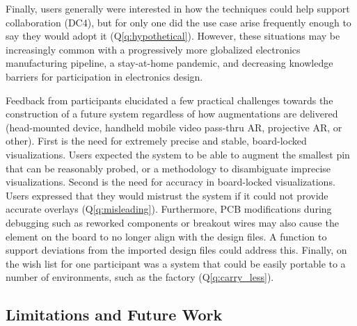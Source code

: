 \documentclass [11pt, proquest] {uwthesis}[2020/02/24]
\newcounter{sharc}
\newcommand{\sharcref}[1]{Q\ref{#1}} %
\begin{document}
Finally, users generally were interested in how the techniques could help support collaboration (DC4), but for only one did the use case arise frequently enough to say they would adopt it (\sharcref{q:hypothetical}). However, these situations may be increasingly common with a progressively more globalized electronics manufacturing pipeline, a stay-at-home pandemic, and decreasing knowledge barriers for participation in electronics design.

Feedback from participants elucidated a few practical challenges towards the construction of a future system regardless of how augmentations are delivered (head-mounted device, handheld mobile video pass-thru AR, projective AR, or other). First is the need for extremely precise and stable, board-locked visualizations. Users expected the system to be able to augment the smallest pin that can be reasonably probed, or a methodology to disambiguate imprecise visualizations. Second is the need for accuracy in board-locked visualizations. Users expressed that they would mistrust the system if it could not provide accurate overlays (\sharcref{q:misleading}). Furthermore, PCB modifications during debugging such as reworked components or breakout wires may also cause the element on the board to no longer align with the design files. A function to support deviations from the imported design files could address this. Finally, on the wish list for one participant was a system that could be easily portable to a number of environments, such as the factory (\sharcref{q:carry_less}). 

\subsection{Limitations and Future Work}
\end{document}
